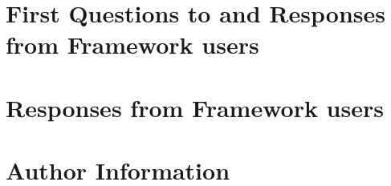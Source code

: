 \documentclass{article}
\begin{document}
\newpage
{}


\newpage
\begin{appendices}

\section{First Questions to and Responses from Framework users}
\label{app:first-questions}


\newpage
\section{Responses from Framework users}
\label{app:answers}


\newpage
\section{Author Information}
\label{app:authors}


\end{appendices}
\end{document}
